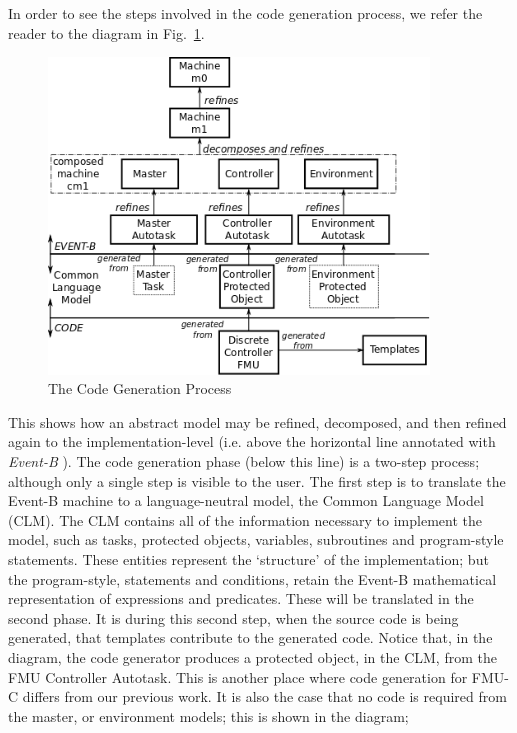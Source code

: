 \documentclass{llncs}%
\begin{document}
In order to see the steps involved in the code generation process, we refer the reader to the diagram in Fig.~\ref{fig:CGProcess}.
%
\begin{figure}
\centering
\includegraphics[width=0.9\textwidth]{devel.png}
\caption{The Code Generation Process}
\label{fig:CGProcess}
\end{figure}
This shows how an abstract model may be refined, decomposed, and then refined again to the implementation-level (i.e. above the horizontal line annotated with \emph{Event-B} ). The code generation phase (below this line) is a two-step process; although only a single step is visible to the user. The first step is to translate the Event-B machine to a language-neutral model, the Common Language Model (CLM). The CLM contains all of the information necessary to implement the model, such as tasks, protected objects, variables, subroutines and program-style statements. These entities represent the `structure' of the implementation; but the program-style, statements and conditions, retain the Event-B mathematical representation of expressions and predicates. These will be translated in the second phase. It is during this second step, when the source code is being generated, that templates contribute to the generated code. Notice that, in the diagram, the code generator produces a protected object, in the CLM, from the FMU Controller Autotask.  This is another place where code generation for FMU-C differs from our previous work. It is also the case that no code is required from the master, or environment models; this is shown in the diagram;
\end{document}

